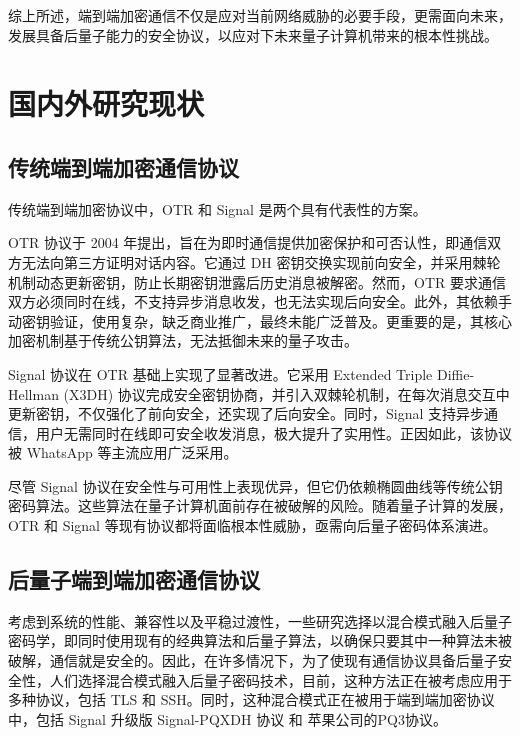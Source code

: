 综上所述，端到端加密通信不仅是应对当前网络威胁的必要手段，更需面向未来，发展具备后量子能力的安全协议，以应对下未来量子计算机带来的根本性挑战。


\section{国内外研究现状}\label{sec:system}

\subsection{传统端到端加密通信协议}

传统端到端加密协议中，OTR 和 Signal 是两个具有代表性的方案。
 
OTR 协议于 2004 年提出，旨在为即时通信提供加密保护和可否认性，即通信双方无法向第三方证明对话内容。它通过 DH 密钥交换实现前向安全，并采用棘轮机制动态更新密钥，防止长期密钥泄露后历史消息被解密。然而，OTR 要求通信双方必须同时在线，不支持异步消息收发，也无法实现后向安全。此外，其依赖手动密钥验证，使用复杂，缺乏商业推广，最终未能广泛普及。更重要的是，其核心加密机制基于传统公钥算法，无法抵御未来的量子攻击。

Signal 协议在 OTR 基础上实现了显著改进。它采用 Extended Triple Diffie-Hellman (X3DH)\cite{marlinspike2016x3dh} 协议完成安全密钥协商，并引入双棘轮机制\cite{alwen2019double}，在每次消息交互中更新密钥，不仅强化了前向安全，还实现了后向安全。同时，Signal 支持异步通信，用户无需同时在线即可安全收发消息，极大提升了实用性。正因如此，该协议被 WhatsApp 等主流应用广泛采用。

尽管 Signal 协议在安全性与可用性上表现优异，但它仍依赖椭圆曲线等传统公钥密码算法。这些算法在量子计算机面前存在被破解的风险。随着量子计算的发展，OTR 和 Signal 等现有协议都将面临根本性威胁，亟需向后量子密码体系演进。






\subsection{后量子端到端加密通信协议}

考虑到系统的性能、兼容性以及平稳过渡性，一些研究选择以混合模式融入后量子密码学，即同时使用现有的经典算法和后量子算法，以确保只要其中一种算法未被破解，通信就是安全的。因此，在许多情况下，为了使现有通信协议具备后量子安全性，人们选择混合模式融入后量子密码技术，目前，这种方法正在被考虑应用于多种协议，包括 TLS\cite{stebila2023hybrid} 和 SSH\cite{kampanakis2023ssh}。同时，这种混合模式正在被用于端到端加密协议中，包括 Signal 升级版 Signal-PQXDH 协议\cite{kret2023pqxdh} 和 苹果公司的PQ3协议\cite{stebila2024security}。

